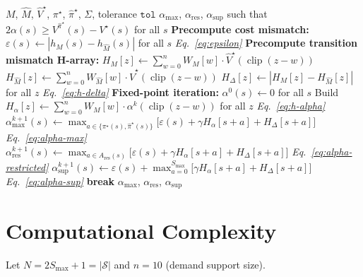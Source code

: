 \documentclass[11pt]{article}
\newcommand{\Smax}{S_{\max}}
\newcommand{\clip}{\operatorname{clip}}
\newcommand{\pistar}{\pi^\star}
\newcommand{\pihatstar}{\hat\pi^\star}
\newcommand{\Vstar}{V^\star}
\newcommand{\Vhatstar}{\hat V^\star}
\newcommand{\Vpihat}{V^{\pihatstar}}
\newcommand{\alphares}{\alpha_{\mathrm{res}}}
\begin{document}
\begin{algorithm}[H]
\caption{Sample-Path Dependent AIS Bound}
\label{alg:sample-path}
\begin{algorithmic}[1]
\Require $M$, $\hat M$, $\Vhatstar$, $\pistar$, $\pihatstar$, $\Sigma$, tolerance $\texttt{tol}$
\Ensure $\alpha_{\max}$, $\alphares$, $\alpha_{\sup}$ such that
        $2\alpha(s) \ge \Vpihat(s) - \Vstar(s)$ for all $s$
\Statex
\State \textbf{Precompute cost mismatch:}
  $\varepsilon(s) \gets |h_M(s) - h_{\hat M}(s)|$ for all $s$
  \hfill \textit{Eq.~\eqref{eq:epsilon}}
\Statex
\State \textbf{Precompute transition mismatch H-array:}
\For{$z = -\Smax$ \textbf{to} $2\Smax$}
  \State $H_M[z] \gets \sum_{w=0}^{n} W_M[w] \cdot \Vhatstar(\clip(z-w))$
  \State $H_{\hat M}[z] \gets \sum_{w=0}^{n} W_{\hat M}[w] \cdot \Vhatstar(\clip(z-w))$
\EndFor
\State $H_\Delta[z] \gets |H_M[z] - H_{\hat M}[z]|$ for all $z$
  \hfill \textit{Eq.~\eqref{eq:h-delta}}
\Statex
\State \textbf{Fixed-point iteration:}
\State $\alpha^0(s) \gets 0$ for all $s$
  \State Build $H_\alpha[z] \gets \sum_{w=0}^{n} W_M[w] \cdot \alpha^k(\clip(z-w))$
    for all $z$
    \hfill \textit{Eq.~\eqref{eq:h-alpha}}
    \State $\alpha^{k+1}_{\max}(s) \gets
      \max_{a \in \{\pistar(s) , \pihatstar(s)\}}
      \bigl[\varepsilon(s) + \gamma H_\alpha[s+a] + H_\Delta[s+a]\bigr]$
      \hfill \textit{Eq.~\eqref{eq:alpha-max}}
    \State $\alphares^{k+1}(s) \gets
      \max_{a \in A_{\mathrm{res}}(s)}
      \bigl[\varepsilon(s) + \gamma H_\alpha[s+a] + H_\Delta[s+a]\bigr]$
      \hfill \textit{Eq.~\eqref{eq:alpha-restricted}}
    \State $\alpha^{k+1}_{\sup}(s) \gets
      \varepsilon(s) + \max_{a=0}^{\Smax}
      \bigl[\gamma H_\alpha[s+a] + H_\Delta[s+a]\bigr]$
      \hfill \textit{Eq.~\eqref{eq:alpha-sup}}
  \EndFor
    \State \textbf{break}
  \EndIf
\EndFor
\State \Return $\alpha_{\max}$, $\alphares$, $\alpha_{\sup}$
\end{algorithmic}
\end{algorithm}

\section{Computational Complexity}

Let $N = 2\Smax + 1 = |\mathcal{S}|$ and $n = 10$ (demand support size).
\end{document}
